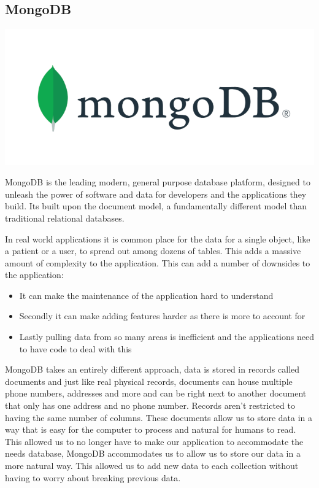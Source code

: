 \subsection{MongoDB}
\includegraphics[scale=0.5]{img/MongoDB-logo.png} \par
MongoDB is the leading modern, general purpose database platform, designed to unleash the power of software and data for developers and the applications they build. Its built upon the document model, a fundamentally different model than traditional relational databases. \par
In real world applications it is common place for the data for a single object, like a patient or a user, to spread out among dozens of tables. This adds a massive amount of complexity to the application. This can add a number of downsides to the application:
\begin{itemize}
\item It can make the maintenance of the application hard to understand
\item Secondly it can make adding features harder as there is more to account for
\item Lastly pulling data from so many areas is inefficient and the applications need to have code to deal with this
\end{itemize}
\par MongoDB takes an entirely different approach, data is stored in records called documents and just like real physical records, documents can house multiple phone numbers, addresses and more and can be right next to another document that only has one address and no phone number. Records aren't restricted to having the same number of columns. These documents allow us to store data in a way that is easy for the computer to process and natural for humans to read. This allowed us to no longer have to make our application to accommodate the needs database, MongoDB accommodates us to allow us to store our data in a more natural way. This allowed us to add new data to each collection without having to worry about breaking previous data. \par

